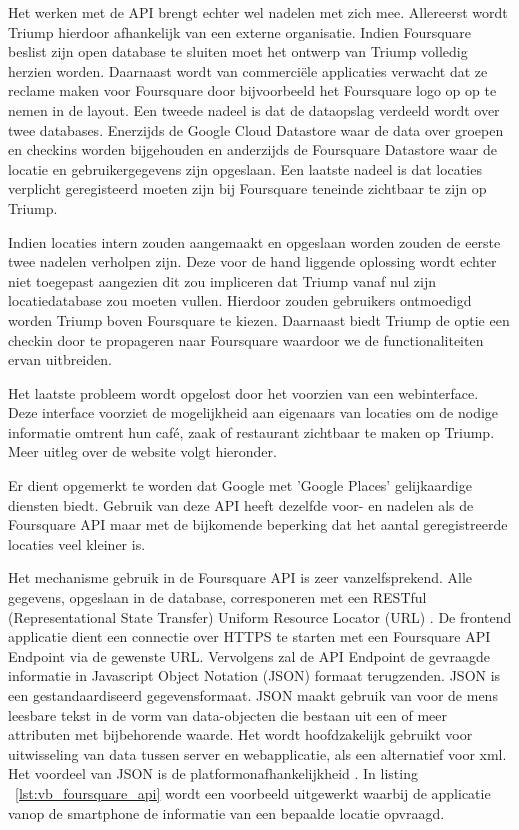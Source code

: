 Het werken met de API brengt echter wel nadelen met zich mee.
Allereerst wordt Triump hierdoor afhankelijk van een externe organisatie. Indien Foursquare beslist zijn open database te sluiten moet het ontwerp van Triump volledig herzien worden. Daarnaast wordt van commerciële applicaties verwacht dat ze reclame maken voor Foursquare door bijvoorbeeld het Foursquare logo op op te nemen in de layout.  Een tweede nadeel is dat de dataopslag verdeeld wordt over twee databases. Enerzijds de Google Cloud Datastore waar de data over groepen en checkins worden bijgehouden en anderzijds de Foursquare Datastore waar de locatie en gebruikergegevens zijn opgeslaan. Een laatste nadeel is dat locaties verplicht geregisteerd moeten zijn bij Foursquare teneinde zichtbaar te zijn op Triump. 

Indien locaties intern zouden aangemaakt en opgeslaan worden zouden de eerste twee nadelen verholpen zijn. 
Deze voor de hand liggende oplossing wordt echter niet toegepast aangezien dit zou impliceren dat Triump vanaf nul zijn locatiedatabase zou moeten vullen. Hierdoor zouden gebruikers ontmoedigd worden Triump boven Foursquare te kiezen. Daarnaast biedt Triump de optie een checkin door te propageren naar Foursquare waardoor we de functionaliteiten ervan uitbreiden. 

Het laatste probleem wordt opgelost door het voorzien van een webinterface. Deze interface voorziet de mogelijkheid aan eigenaars van locaties om de nodige informatie omtrent hun café, zaak of restaurant zichtbaar te maken op Triump. Meer uitleg over de website volgt hieronder.

Er dient opgemerkt te worden dat Google met 'Google Places' gelijkaardige diensten biedt. Gebruik van deze API heeft dezelfde voor- en nadelen als de Foursquare API maar met de bijkomende beperking dat het aantal geregistreerde locaties veel kleiner is.


Het mechanisme gebruik in de Foursquare API is zeer vanzelfsprekend. Alle gegevens, opgeslaan in de database, corresponeren met een RESTful (Representational State Transfer) Uniform Resource Locator (URL)  \cite{FS_API_website}. De frontend applicatie dient een connectie over HTTPS te starten met een Foursquare API Endpoint via de gewenste URL. Vervolgens zal de API Endpoint de gevraagde informatie in Javascript Object Notation (JSON) formaat terugzenden. JSON is een gestandaardiseerd gegevensformaat. JSON maakt gebruik van voor de mens leesbare tekst in de vorm van data-objecten die bestaan uit een of meer attributen met bijbehorende waarde. Het wordt hoofdzakelijk gebruikt voor uitwisseling van data tussen server en webapplicatie, als een alternatief voor xml. Het voordeel van JSON is de platformonafhankelijkheid \cite{JSON_def}. In listing ~\ref{lst:vb_foursquare_api} wordt een voorbeeld uitgewerkt waarbij de applicatie vanop de smartphone de informatie van een bepaalde locatie opvraagd.


